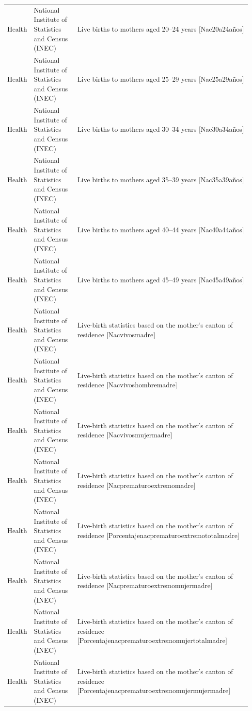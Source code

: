 \begin{landscape}
\begin{longtable}[t]{>{\raggedright\arraybackslash}p{3.4cm}>{\raggedright\arraybackslash}p{5.6cm}>{\raggedright\arraybackslash}p{12.4cm}}
Health & National Institute of Statistics and Census (INEC) & Live births to mothers aged 20–24 years [Nac20a24años]\\
Health & National Institute of Statistics and Census (INEC) & Live births to mothers aged 25–29 years [Nac25a29años]\\
Health & National Institute of Statistics and Census (INEC) & Live births to mothers aged 30–34 years [Nac30a34años]\\
Health & National Institute of Statistics and Census (INEC) & Live births to mothers aged 35–39 years [Nac35a39años]\\
Health & National Institute of Statistics and Census (INEC) & Live births to mothers aged 40–44 years [Nac40a44años]\\
Health & National Institute of Statistics and Census (INEC) & Live births to mothers aged 45–49 years [Nac45a49años]\\
Health & National Institute of Statistics and Census (INEC) & Live-birth statistics based on the mother's canton of residence [Nacvivosmadre]\\
Health & National Institute of Statistics and Census (INEC) & Live-birth statistics based on the mother's canton of residence [Nacvivoshombremadre]\\
Health & National Institute of Statistics and Census (INEC) & Live-birth statistics based on the mother's canton of residence [Nacvivosmujermadre]\\
Health & National Institute of Statistics and Census (INEC) & Live-birth statistics based on the mother's canton of residence [Nacprematuroextremomad\allowbreak{}re]\\
Health & National Institute of Statistics and Census (INEC) & Live-birth statistics based on the mother's canton of residence [Porcentajenacprematuro\allowbreak{}extremototalmadre]\\
Health & National Institute of Statistics and Census (INEC) & Live-birth statistics based on the mother's canton of residence [Nacprematuroextremomuj\allowbreak{}ermadre]\\
Health & National Institute of Statistics and Census (INEC) & Live-birth statistics based on the mother's canton of residence [Porcentajenacprematuro\allowbreak{}extremomujertotalmadre]\\
Health & National Institute of Statistics and Census (INEC) & Live-birth statistics based on the mother's canton of residence [Porcentajenacprematuro\allowbreak{}extremomujermujermadre]\\

\end{longtable}
\end{landscape}
